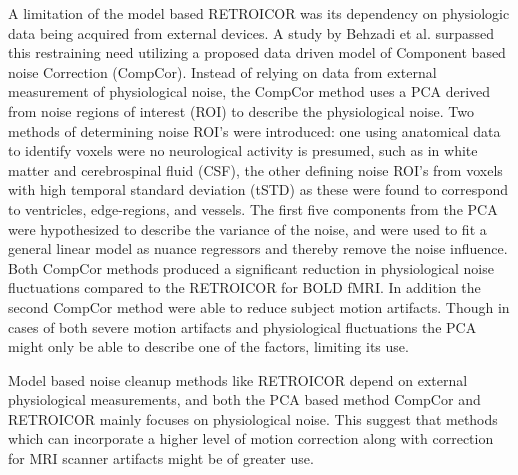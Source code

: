 A limitation of the model based RETROICOR was its dependency on physiologic data being acquired from external devices. A study by Behzadi et al. \cite{Behzadi2013} surpassed this restraining need utilizing a proposed data driven model of Component based noise Correction (CompCor). Instead of relying on data from external measurement of physiological noise, the CompCor method uses a PCA derived from noise regions of interest (ROI) to describe the physiological noise. Two methods of determining noise ROI’s were introduced: one using anatomical data to identify voxels were no neurological activity is presumed, such as in white matter and cerebrospinal fluid (CSF), the other defining noise ROI’s from voxels with high temporal standard deviation (tSTD) as these were found to correspond to ventricles, edge-regions, and vessels. The first five components from the PCA were hypothesized to describe the variance of the noise, and were used to fit a general linear model as nuance regressors and thereby remove the noise influence. Both CompCor methods produced a significant reduction in physiological noise fluctuations compared to the RETROICOR for BOLD fMRI. In addition the second CompCor method were able to reduce subject motion artifacts. Though in cases of both severe motion artifacts and physiological fluctuations the PCA might only be able to describe one of the factors, limiting its use. \cite{Behzadi2013}

Model based noise cleanup methods like RETROICOR depend on external physiological measurements, and both the PCA based method CompCor and RETROICOR mainly focuses on physiological noise. This suggest that methods which can incorporate a higher level of motion correction along with correction for MRI scanner artifacts might be of greater use. 

